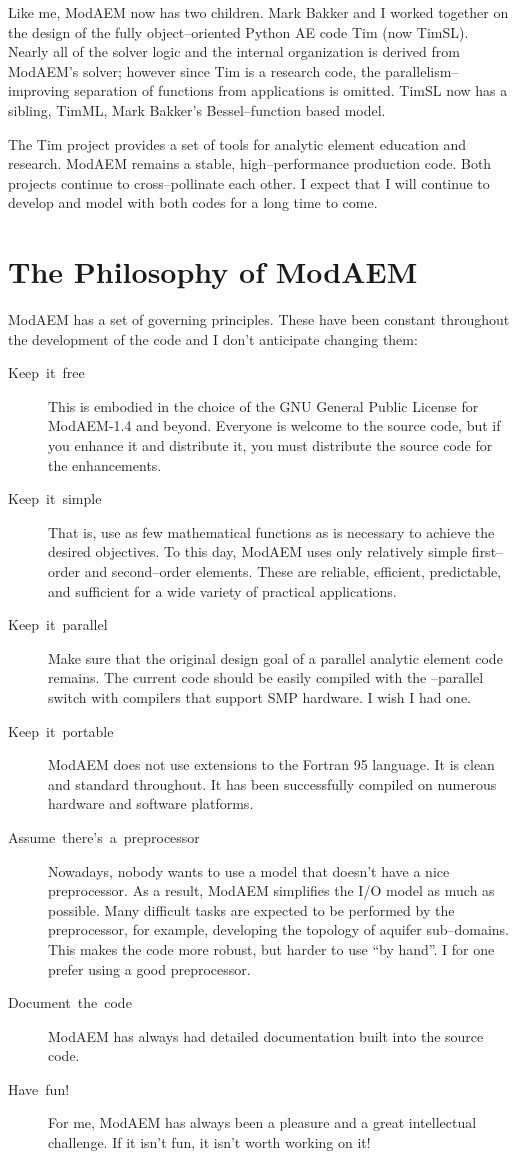 Like me, ModAEM now has two children. Mark Bakker and I worked together
on the design of the fully object--oriented Python AE code Tim (now
TimSL). Nearly all of the solver logic and the internal organization
is derived from ModAEM's solver; however since Tim is a research code,
the parallelism--improving separation of functions from applications
is omitted. TimSL now has a sibling, TimML, Mark Bakker's Bessel--function
based model. 

The Tim project provides a set of tools for analytic element education
and research. ModAEM remains a stable, high--performance production
code. Both projects continue to cross--pollinate each other. I expect
that I will continue to develop and model with both codes for a long
time to come. 


\section{The Philosophy of ModAEM}

ModAEM has a set of governing principles. These have been constant
throughout the development of the code and I don't anticipate changing
them:
\begin{description}
\item [{Keep~it~free}] This is embodied in the choice of the GNU General
Public License for ModAEM-1.4 and beyond. Everyone is welcome to the
source code, but if you enhance it and distribute it, you must distribute
the source code for the enhancements. 
\item [{Keep~it~simple}] That is, use as few mathematical functions as
is necessary to achieve the desired objectives. To this day, ModAEM
uses only relatively simple first--order and second--order elements.
These are reliable, efficient, predictable, and sufficient for a wide
variety of practical applications.
\item [{Keep~it~parallel}] Make sure that the original design goal of
a parallel analytic element code remains. The current code should
be easily compiled with the --parallel switch with compilers that
support SMP hardware. I wish I had one.
\item [{Keep~it~portable}] ModAEM does not use extensions to the Fortran
95 language. It is clean and standard throughout. It has been successfully
compiled on numerous hardware and software platforms.
\item [{Assume~there's~a~preprocessor}] Nowadays, nobody wants to use
a model that doesn't have a nice preprocessor. As a result, ModAEM
simplifies the I/O model as much as possible. Many difficult tasks
are expected to be performed by the preprocessor, for example, developing
the topology of aquifer sub--domains. This makes the code more robust,
but harder to use ``by hand''. I for one prefer using a good preprocessor.
\item [{Document~the~code}] ModAEM has always had detailed documentation
built into the source code.
\item [{Have~fun!}] For me, ModAEM has always been a pleasure and a great
intellectual challenge. If it isn't fun, it isn't worth working on
it!
\end{description}

